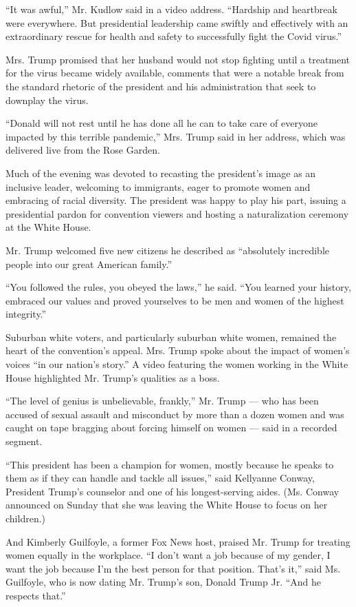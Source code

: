 ``It was awful,'' Mr. Kudlow said in a video address. ``Hardship and
heartbreak were everywhere. But presidential leadership came swiftly and
effectively with an extraordinary rescue for health and safety to
successfully fight the Covid virus.''

Mrs. Trump promised that her husband would not stop fighting until a
treatment for the virus became widely available, comments that were a
notable break from the standard rhetoric of the president and his
administration that seek to downplay the virus.

``Donald will not rest until he has done all he can to take care of
everyone impacted by this terrible pandemic,'' Mrs. Trump said in her
address, which was delivered live from the Rose Garden.

Much of the evening was devoted to recasting the president's image as an
inclusive leader, welcoming to immigrants, eager to promote women and
embracing of racial diversity. The president was happy to play his part,
issuing a presidential pardon for convention viewers and hosting a
naturalization ceremony at the White House.

Mr. Trump welcomed five new citizens he described as ``absolutely
incredible people into our great American family.''

``You followed the rules, you obeyed the laws,'' he said. ``You learned
your history, embraced our values and proved yourselves to be men and
women of the highest integrity.''

Suburban white voters, and particularly suburban white women, remained
the heart of the convention's appeal. Mrs. Trump spoke about the impact
of women's voices ``in our nation's story.'' A video featuring the women
working in the White House highlighted Mr. Trump's qualities as a boss.

``The level of genius is unbelievable, frankly,'' Mr. Trump --- who has
been accused of sexual assault and misconduct by more than a dozen women
and was caught on tape bragging about forcing himself on women --- said
in a recorded segment.

``This president has been a champion for women, mostly because he speaks
to them as if they can handle and tackle all issues,'' said Kellyanne
Conway, President Trump's counselor and one of his longest-serving
aides. (Ms. Conway announced on Sunday that she was leaving the White
House to focus on her children.)

And Kimberly Guilfoyle, a former Fox News host, praised Mr. Trump for
treating women equally in the workplace. ``I don't want a job because of
my gender, I want the job because I'm the best person for that position.
That's it,'' said Ms. Guilfoyle, who is now dating Mr. Trump's son,
Donald Trump Jr. ``And he respects that.''

